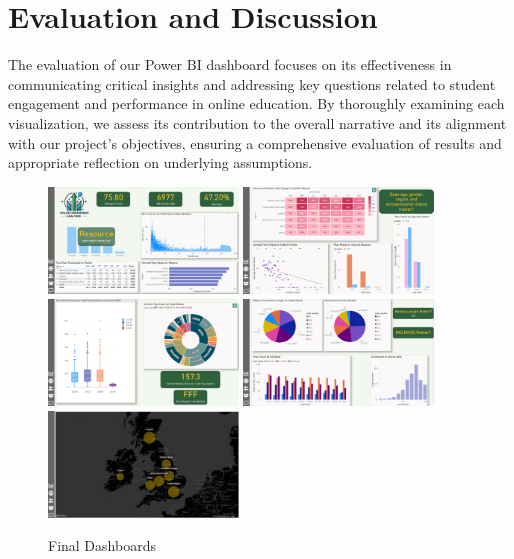 \section{Evaluation and Discussion}

The evaluation of our Power BI dashboard focuses on its effectiveness in communicating critical insights and addressing key questions related to student engagement and performance in online education. By thoroughly examining each visualization, we assess its contribution to the overall narrative and its alignment with our project's objectives, ensuring a comprehensive evaluation of results and appropriate reflection on underlying assumptions.

\begin{figure}[h!]
    \centering
    \includegraphics[width=0.45\textwidth]{photo/d1.PNG}
    \includegraphics[width=0.45\textwidth]{photo/d2.PNG}\\
    \includegraphics[width=0.45\textwidth]{photo/d3.PNG}
    \includegraphics[width=0.45\textwidth]{photo/d4.PNG}
    \includegraphics[width=0.45\textwidth]{photo/d5.PNG}
    \caption{Final Dashboards}
    \label{fig:multiple-images}
\end{figure}


